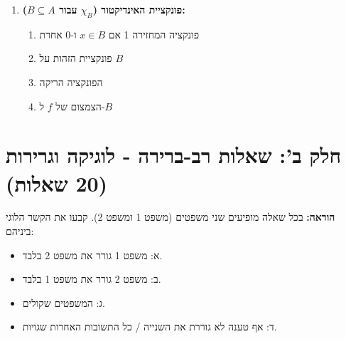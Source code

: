 \documentclass[a4paper,11pt]{article}
\begin{document}
\begin{enumerate}
    \item \textbf{פונקציית האינדיקטור (\(\chi_B\) עבור \(B \subseteq A\)):}
          \begin{enumerate}
              \item פונקציה המחזירה 1 אם \(x \in B\) ו-0 אחרת
              \item פונקציית הזהות על \(B\)
              \item הפונקציה הריקה
              \item הצמצום של \(f\) ל-\(B\)
          \end{enumerate}

\end{enumerate}

\newpage
\section*{חלק ב': שאלות רב-ברירה - לוגיקה וגרירות (20 שאלות)}
\textbf{הוראה:} בכל שאלה מופיעים שני משפטים (משפט 1 ומשפט 2). קבעו את הקשר הלוגי ביניהם:

\begin{itemize}
    \item א: משפט 1 גורר את משפט 2 בלבד.
    \item ב: משפט 2 גורר את משפט 1 בלבד.
    \item ג: המשפטים שקולים.
    \item ד: אף טענה לא גוררת את השנייה / כל התשובות האחרות שגויות.
\end{itemize}
\end{document}
